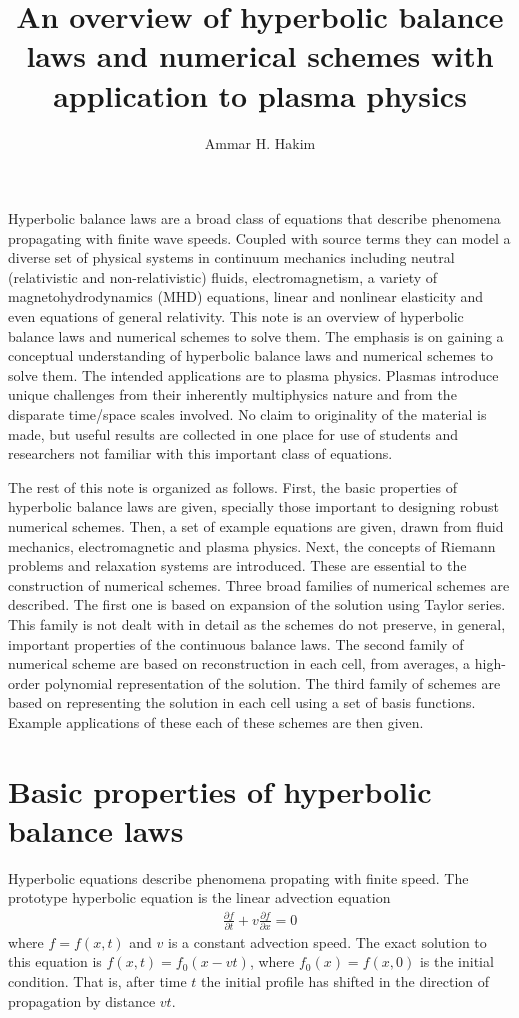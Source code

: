 \documentclass[11pt, reqno]{amsart}
\title[Hyperbolic balance laws]{An overview of hyperbolic balance laws
  and numerical schemes with application to plasma physics}%
\author{Ammar H. Hakim}%
\date{}
\newcommand{\pfrac}[2]{\frac{\partial #1}{\partial #2}}
\theoremstyle{definition}
\begin{document}
\maketitle

Hyperbolic balance laws are a broad class of equations that describe
phenomena propagating with finite wave speeds. Coupled with source
terms they can model a diverse set of physical systems in continuum
mechanics including neutral (relativistic and non-relativistic)
fluids, electromagnetism, a variety of magnetohydrodynamics (MHD)
equations, linear and nonlinear elasticity and even equations of
general relativity. This note is an overview of hyperbolic balance
laws and numerical schemes to solve them. The emphasis is on gaining a
conceptual understanding of hyperbolic balance laws and numerical
schemes to solve them. The intended applications are to plasma
physics. Plasmas introduce unique challenges from their inherently
multiphysics nature and from the disparate time/space scales
involved. No claim to originality of the material is made, but useful
results are collected in one place for use of students and researchers
not familiar with this important class of equations.

The rest of this note is organized as follows. First, the basic
properties of hyperbolic balance laws are given, specially those
important to designing robust numerical schemes. Then, a set of
example equations are given, drawn from fluid mechanics,
electromagnetic and plasma physics. Next, the concepts of Riemann
problems and relaxation systems are introduced. These are essential to
the construction of numerical schemes. Three broad families of
numerical schemes are described. The first one is based on expansion
of the solution using Taylor series. This family is not dealt with in
detail as the schemes do not preserve, in general, important
properties of the continuous balance laws. The second family of
numerical scheme are based on reconstruction in each cell, from
averages, a high-order polynomial representation of the solution. The
third family of schemes are based on representing the solution in each
cell using a set of basis functions. Example applications of these
each of these schemes are then given.

\section{Basic properties of hyperbolic balance laws}

Hyperbolic equations describe phenomena propating with finite
speed. The prototype hyperbolic equation is the linear advection
equation
\begin{align}
  \pfrac{f}{t} + v\pfrac{f}{x} = 0
\end{align}
where $f=f(x,t)$ and $v$ is a constant advection speed. The exact
solution to this equation is $f(x,t) = f_0(x-vt)$, where $f_0(x) =
f(x,0)$ is the initial condition. That is, after time $t$ the initial
profile has shifted in the direction of propagation by distance
$vt$. 
\end{document}
